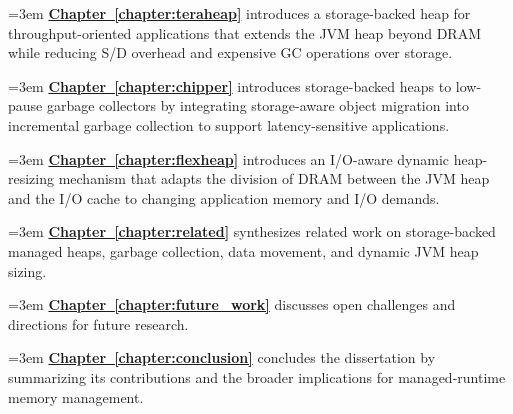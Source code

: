 \vspace{0.8\baselineskip}

\begingroup \setlength{\parskip}{0.8\baselineskip}

\noindent\hangindent=3em \hyperref[chapter:teraheap]{\textbf{Chapter~\ref*{chapter:teraheap}}} introduces a storage-backed heap for throughput-oriented applications that extends the JVM heap beyond DRAM while reducing S/D overhead and expensive GC operations over storage.

\noindent\hangindent=3em \hyperref[chapter:chipper]{\textbf{Chapter~\ref*{chapter:chipper}}} introduces storage-backed heaps to low-pause garbage collectors by integrating storage-aware object migration into incremental garbage collection to support latency-sensitive applications.

\noindent\hangindent=3em \hyperref[chapter:flexheap]{\textbf{Chapter~\ref*{chapter:flexheap}}} introduces an I/O-aware dynamic heap-resizing mechanism that adapts the division of DRAM between the JVM heap and the I/O cache to changing application memory and I/O demands.

\noindent\hangindent=3em \hyperref[chapter:related]{\textbf{Chapter~\ref*{chapter:related}}} synthesizes related work on storage-backed managed heaps, garbage collection, data movement, and dynamic JVM heap sizing.

\noindent\hangindent=3em \hyperref[chapter:future_work]{\textbf{Chapter~\ref*{chapter:future_work}}} discusses open challenges and directions for future research.

\noindent\hangindent=3em \hyperref[chapter:conclusion]{\textbf{Chapter~\ref*{chapter:conclusion}}} concludes the dissertation by summarizing its contributions and the broader implications for managed-runtime memory management.

\par \endgroup












































